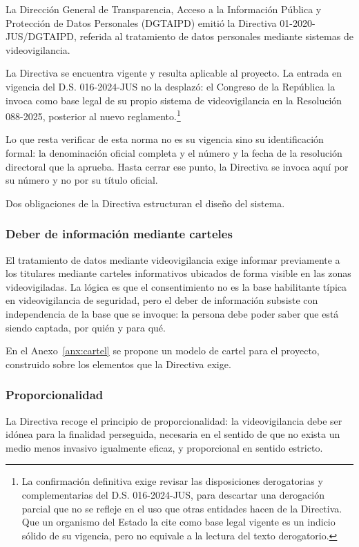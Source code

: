 La Dirección General de Transparencia, Acceso a la Información Pública y
Protección de Datos Personales (DGTAIPD) emitió la Directiva
01-2020-JUS/DGTAIPD, referida al tratamiento de datos personales mediante
sistemas de videovigilancia.

La Directiva se encuentra vigente y resulta aplicable al proyecto. La
entrada en vigencia del D.S. 016-2024-JUS no la desplazó: el Congreso de
la República la invoca como base legal de su propio sistema de
videovigilancia en la Resolución 088-2025, posterior al nuevo
reglamento.\footnote{La confirmación definitiva exige revisar las
disposiciones derogatorias y complementarias del D.S. 016-2024-JUS, para
descartar una derogación parcial que no se refleje en el uso que otras
entidades hacen de la Directiva. Que un organismo del Estado la cite como
base legal vigente es un indicio sólido de su vigencia, pero no equivale
a la lectura del texto derogatorio.}

Lo que resta verificar de esta norma no es su vigencia sino su
identificación formal: la denominación oficial completa y el número y la
fecha de la resolución directoral que la aprueba. Hasta cerrar ese punto,
la Directiva se invoca aquí por su número y no por su título oficial.

Dos obligaciones de la Directiva estructuran el diseño del sistema.

\subsubsection{Deber de información mediante carteles}

El tratamiento de datos mediante videovigilancia exige informar
previamente a los titulares mediante carteles informativos ubicados de
forma visible en las zonas videovigiladas. La lógica es que el
consentimiento no es la base habilitante típica en videovigilancia de
seguridad, pero el deber de información subsiste con independencia de la
base que se invoque: la persona debe poder saber que está siendo captada,
por quién y para qué.

En el Anexo~\ref{anx:cartel} se propone un modelo de cartel para el
proyecto, construido sobre los elementos que la Directiva exige.

\subsubsection{Proporcionalidad}

La Directiva recoge el principio de proporcionalidad: la videovigilancia
debe ser idónea para la finalidad perseguida, necesaria en el sentido de
que no exista un medio menos invasivo igualmente eficaz, y proporcional
en sentido estricto.

